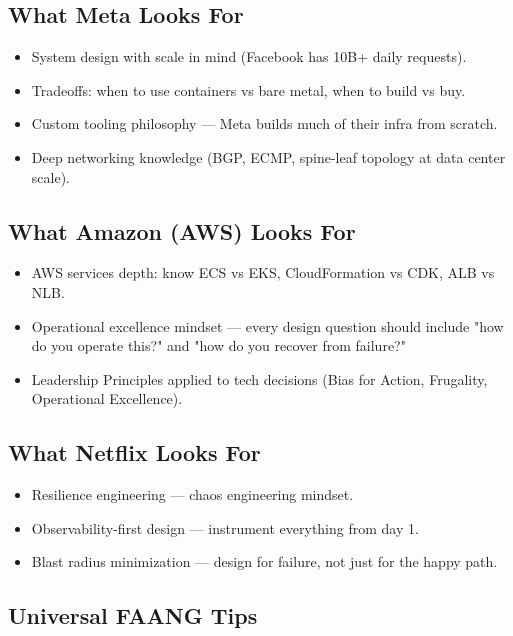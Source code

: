 \documentclass[11pt]{article}
\providecommand{\tightlist}{\setlength{\itemsep}{1pt}\setlength{\parskip}{0pt}}
\begin{document}
\subsection{What Meta Looks For}\label{what-meta-looks-for}

\begin{itemize}
\tightlist
\item
  System design with scale in mind (Facebook has 10B+ daily requests).
\item
  Tradeoffs: when to use containers vs bare metal, when to build vs buy.
\item
  Custom tooling philosophy --- Meta builds much of their infra from scratch.
\item
  Deep networking knowledge (BGP, ECMP, spine-leaf topology at data center scale).
\end{itemize}

\subsection{What Amazon (AWS) Looks For}\label{what-amazon-aws-looks-for}

\begin{itemize}
\tightlist
\item
  AWS services depth: know ECS vs EKS, CloudFormation vs CDK, ALB vs NLB.
\item
  Operational excellence mindset --- every design question should include "how do you operate this?" and "how do you recover from failure?"
\item
  Leadership Principles applied to tech decisions (Bias for Action, Frugality, Operational Excellence).
\end{itemize}

\subsection{What Netflix Looks For}\label{what-netflix-looks-for}

\begin{itemize}
\tightlist
\item
  Resilience engineering --- chaos engineering mindset.
\item
  Observability-first design --- instrument everything from day 1.
\item
  Blast radius minimization --- design for failure, not just for the happy path.
\end{itemize}

\subsection{Universal FAANG Tips}\label{universal-faang-tips}
\end{document}
